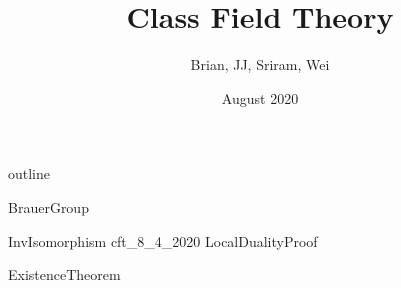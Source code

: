 \documentclass{article}
\title{Class Field Theory}
\author{Brian, JJ, Sriram, Wei}
\date{August 2020}
\begin{document}
\maketitle

{outline}

{BrauerGroup}

{InvIsomorphism}
{cft_8_4_2020}
{LocalDualityProof}

{ExistenceTheorem}
\end{document}

